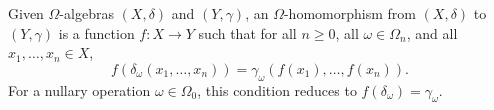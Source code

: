 Given $\Omega$-algebras $(X, \delta)$ and $(Y, \gamma)$, an $\Omega$-homomorphism from $(X, \delta)$ to $(Y, \gamma)$ is a function $f: X \longrightarrow Y$ such that for all $n \geq 0$, all $\omega \in \Omega_n$, and all $x_1, \ldots, x_n \in X$,
$$
f(\delta_\omega(x_1, \ldots, x_n)) = \gamma_\omega(f(x_1), \ldots, f(x_n)).
$$
For a nullary operation $\omega \in \Omega_0$, this condition reduces to $f(\delta_\omega) = \gamma_\omega$.
